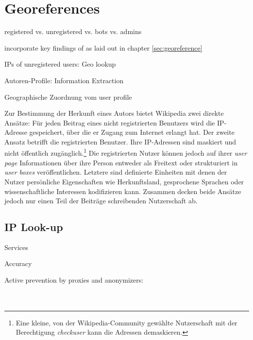 


\section{Georeferences}

\begin{todos}
    \item registered vs. unregistered vs. bots vs. admins
    \item incorporate key findings of \cite{hardy2011volunteered} as laid out in chapter \ref{sec:georeference}
    \item IPs of unregistered users: Geo lookup
    \item Autoren-Profile: Information Extraction
    \item Geographische Zuordnung vom user profile
\end{todos}

Zur Bestimmung der Herkunft eines Autors bietet Wikipedia zwei direkte Ansätze: 
Für jeden Beitrag eines nicht registrierten Benutzers wird die IP-Adresse gespeichert, über die er Zugang zum Internet erlangt hat. 
Der zweite Ansatz betrifft die registrierten Benutzer.
Ihre IP-Adressen sind maskiert und nicht öffentlich zugänglich.\footnote{Eine kleine, von der Wikipedia-Community gewählte Nutzerschaft mit der Berechtigung \emph{checkuser} kann die Adressen demaskieren.}
Die registrierten Nutzer können jedoch auf ihrer \emph{user page} Informationen über ihre Person entweder als Freitext oder strukturiert in \emph{user boxes} veröffentlichen.
Letztere sind definierte Einheiten mit denen der Nutzer persönliche Eigenschaften wie Herkunftsland, gesprochene Sprachen oder wissenschaftliche Interessen kodifizieren kann.
Zusammen decken beide Ansätze jedoch nur einen Teil der Beiträge schreibenden Nutzerschaft ab.


\subsection{IP Look-up}

\begin{todos}
    \item Services
    \item Accuracy
    \item Active prevention by proxies and anonymizers: 
    \\  
    \\ 
    \\ 
\end{todos}

